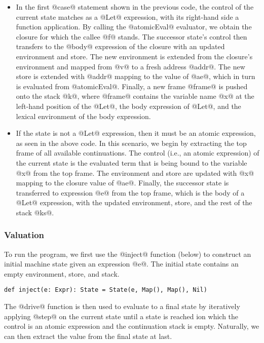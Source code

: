 \documentclass[acmsmall,review,anonymous]{acmart}\settopmatter{printfolios=true,printccs=false,printacmref=false}
\begin{document}
\begin{itemize}

\item In the first @case@ statement shown in the previous code,
the control of the current state matches as a @Let@ expression, with its right-hand side a
function application.
By calling the @atomicEval@ evaluator, we obtain the closure for which the callee @f@ stands.
The successor state's control then transfers to the @body@ expression of the closure
with an updated environment and store. The new environment is extended
from the closure's environment and mapped from @v@ to a fresh address @addr@.
The new store is extended with @addr@ mapping to the value of @ae@,
which in turn is evaluated from @atomicEval@.
Finally, a new frame @frame@ is pushed onto the stack @k@, where
@frame@ contains the variable name @x@ at the left-hand position of the @Let@,
the body expression of @Let@, and the lexical environment of the body expression.

\item If the state is not a @Let@ expression, then it must be
an atomic expression, as seen in the above code. In this scenario,
we begin by extracting the top frame of all available continuations.
The control (i.e., an atomic expression) of the current state is the evaluated term
that is being bound to the variable @x@ from the top frame.
The environment and store are updated with @x@ mapping to the closure value of @ae@.
Finally, the successor state is transferred to expression @e@ from the top frame,
which is the body of a @Let@ expression, with the updated environment, store, and
the rest of the stack @ks@.

\end{itemize}

\subsubsection{Valuation}

To run the program, we first use the @inject@ function (below) to construct an initial machine
state given an expression @e@. The initial state contains an empty environment,
store, and stack.
\begin{lstlisting}
def inject(e: Expr): State = State(e, Map(), Map(), Nil)
\end{lstlisting}

The @drive@ function is then used to evaluate
to a final state by iteratively applying @step@ on the current state until a state is reached
ion which the control is an atomic expression and the continuation stack is empty.
Naturally, we can then extract the value from the final state at last.
\end{document}
